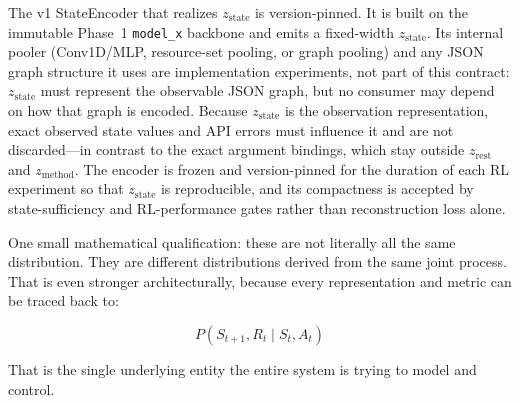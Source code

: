 \documentclass{article}
\begin{document}
The v1 StateEncoder that realizes $z_{\text{state}}$ is version-pinned. It is built on the immutable Phase~1 \texttt{model\_x} backbone and emits a fixed-width $z_{\text{state}}$. Its internal pooler (Conv1D/MLP, resource-set pooling, or graph pooling) and any JSON graph structure it uses are implementation experiments, not part of this contract: $z_{\text{state}}$ must represent the observable JSON graph, but no consumer may depend on how that graph is encoded. Because $z_{\text{state}}$ is the observation representation, exact observed state values and API errors must influence it and are not discarded---in contrast to the exact argument bindings, which stay outside $z_{\text{rest}}$ and $z_{\text{method}}$. The encoder is frozen and version-pinned for the duration of each RL experiment so that $z_{\text{state}}$ is reproducible, and its compactness is accepted by state-sufficiency and RL-performance gates rather than reconstruction loss alone.

One small mathematical qualification: these are not literally all the same distribution. They are different distributions derived from the same joint process. That is even stronger architecturally, because every representation and metric can be traced back to:

$$
P\left(S_{t+1}, R_t \mid S_t, A_t\right)
$$

That is the single underlying entity the entire system is trying to model and control.
\end{document}
